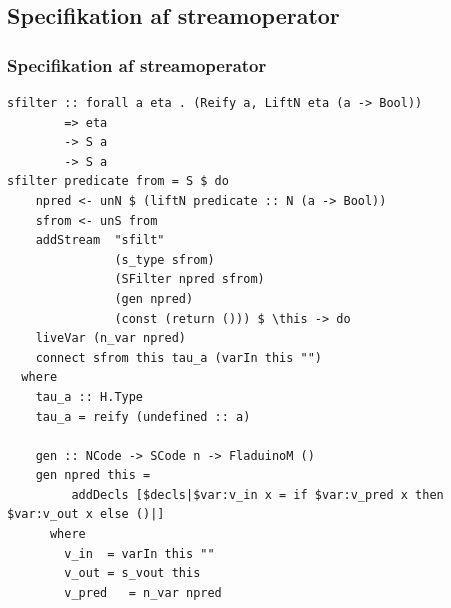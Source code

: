 \documentclass{beamer}
\begin{document}
\subsection{Specifikation af streamoperator}
\begin{frame}[t, fragile]
  \frametitle{Specifikation af streamoperator} 

\tiny
\begin{verbatim}
sfilter :: forall a eta . (Reify a, LiftN eta (a -> Bool))
        => eta
        -> S a
        -> S a
sfilter predicate from = S $ do
    npred <- unN $ (liftN predicate :: N (a -> Bool))
    sfrom <- unS from
    addStream  "sfilt"
               (s_type sfrom)
               (SFilter npred sfrom)
               (gen npred)
               (const (return ())) $ \this -> do
    liveVar (n_var npred)
    connect sfrom this tau_a (varIn this "")
  where
    tau_a :: H.Type
    tau_a = reify (undefined :: a)

    gen :: NCode -> SCode n -> FladuinoM ()
    gen npred this = 
         addDecls [$decls|$var:v_in x = if $var:v_pred x then $var:v_out x else ()|]
      where
        v_in  = varIn this ""
        v_out = s_vout this
        v_pred   = n_var npred
\end{verbatim}

\normalsize

\end{frame}
\end{document}
